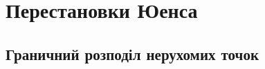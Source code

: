 

\usepackage{framed}
\usepackage{dsfont}
\usepackage{xcolor}

\renewcommand{\emph}[1]{\textit{#1}}
\renewcommand{\P}[1]{\mathbb{P}\left\{#1\right\}}
\newcommand{\Pn}[1]{\mathbb{P}'\left\{#1\right\}}
\newcommand{\E}{\mathbb{E}}
\newcommand{\D}{\mathbb{D}}
\newcommand{\N}{\mathbb{N}}
\newcommand{\Z}{\mathbb{Z}}
\newcommand{\R}{\mathbb{R}}
\newcommand{\X}{\mathbb{X}}
\newcommand{\g}{\gamma}
\newcommand{\Poiss}[1]{\mathrm{Poiss}\left(#1\right)}
\newcommand{\Unif}[1]{\mathrm{Unif}\left(#1\right)}
\newcommand{\Exp}[1]{\mathrm{Exp}\left(#1\right)}
\DeclareMathOperator{\card}{card}
\DeclarePairedDelimiter\ceil{\lceil}{\rceil}
\DeclarePairedDelimiter\floor{\lfloor}{\rfloor}
\DeclareMathOperator{\Sum}{sum}
\renewcommand{\L}[1]{\mathcal{L}\left\{#1\right\}}
\DeclareMathOperator{\smax}{s-max}
\DeclareMathOperator{\smin}{s-min}
\DeclareMathOperator{\cycle}{c}
\DeclareMathOperator{\inv}{i}
\newcommand{\cov}[2]{\mathrm{cov}\left(#1, #2\right)}

\newcommand*{\defeq}{\stackrel{\text{def}}{=}}
\makeatletter
\newcommand\incircbin
{%
  \mathpalette\@incircbin
}
\newcommand\@incircbin[2]
{%
  \mathbin%
  {%
    \ooalign{\hidewidth$#1#2$\hidewidth\crcr$#1\bigcirc$}%
  }%
}
\newcommand{\oeq}{\incircbin{=}}
\makeatother

\newtheorem{theorem}{Теорема}[section]
\newtheorem*{theorem*}{Теорема}
\newtheorem{corollary}{Наслідок}[theorem]
\newtheorem{lemma}[theorem]{Лема}
\newtheorem*{remark}{Зауваження}


\tableofcontents
\chapter{Перестановки Юенса}
    \section{Граничний розподіл нерухомих точок}
        
